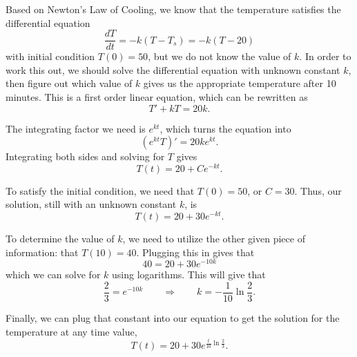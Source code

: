 \documentclass{ximera}
\begin{document}
\begin{exampleSol}
    Based on Newton's Law of Cooling, we know that the temperature satisfies the differential equation
    \begin{equation*}
        \frac{dT}{dt} = -k(T - T_s) = -k(T - 20)
    \end{equation*} 
    with initial condition $T(0) = 50$, but we do not know the value of $k$. In order to work this out, we should solve the differential equation with unknown constant $k$, then figure out which value of $k$ gives us the appropriate temperature after 10 minutes. This is a first order linear equation, which can be rewritten as 
    \begin{equation*}
        T' + kT = 20k.
    \end{equation*}
    
    The integrating factor we need is $e^{kt}$, which turns the equation into
    \begin{equation*}
        (e^{kt}T)' = 20ke^{kt}.
    \end{equation*}
    Integrating both sides and solving for $T$ gives
    \begin{equation*}
        T(t) = 20 + Ce^{-kt}.
    \end{equation*}
    
    To satisfy the initial condition, we need that $T(0) = 50$, or $C = 30$. Thus, our solution, still with an unknown constant $k$, is
    \begin{equation*}
        T(t) = 20 + 30e^{-kt}.
    \end{equation*}
    
    To determine the value of $k$, we need to utilize the other given piece of information: that $T(10) = 40$. Plugging this in gives that
    \begin{equation*}
        40 = 20 + 30e^{-10k}
    \end{equation*}
    which we can solve for $k$ using logarithms. This will give that
    \begin{equation*}
        \frac{2}{3} = e^{-10k} \qquad \Rightarrow \qquad k = -\frac{1}{10} \ln{ \frac{2}{3}}.
    \end{equation*}
    
    Finally, we can plug that constant into our equation to get the solution for the temperature at any time value,
    \begin{equation*}
        T(t) = 20+30e^{\frac{t}{10}\ln{\frac{2}{3}}}. 
    \end{equation*}
\end{exampleSol} 
\end{document}
